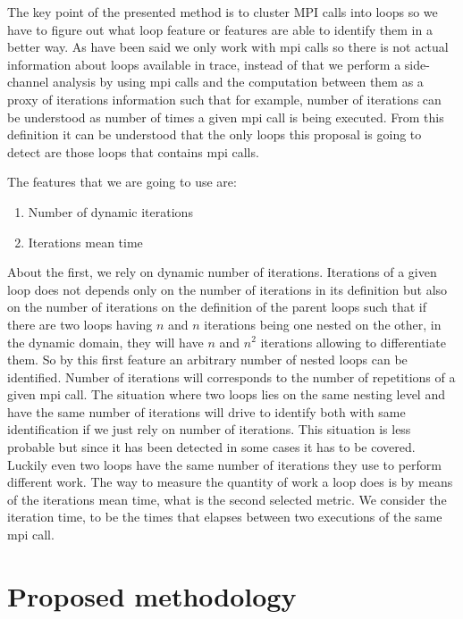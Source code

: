 The key point of the presented method is to cluster MPI calls into loops so we
have to figure out what loop
feature or features are able to identify them in a better way. As have been said
we only work with mpi calls so there is not actual information about loops
available in trace, instead of that we perform a side-channel analysis by using
mpi calls and the computation between them as a proxy of iterations information such
that for example, number of iterations can be understood as number of times a
given mpi call is being executed. From this definition it can be understood that
the only loops this proposal is going to detect are those loops that contains
mpi calls.

The features that we are going to use are:
\begin{enumerate}[label=\roman*)] 
  \item Number of dynamic iterations
  \item Iterations mean time
\end{enumerate}
About the first,  we rely on dynamic number of iterations. 
Iterations of a given loop does not depends only on the number of iterations in
its definition but also on the number of iterations on the definition of the
parent loops such that if there are two loops having $n$ and $n$ iterations
being one nested on the other, in the dynamic domain, they will have $n$ and 
$n^2$ iterations allowing to differentiate them. So by this first feature an
arbitrary number of nested loops can be identified.
Number of iterations will corresponds to the number of repetitions of a given 
mpi call.
The situation where two loops lies on the same nesting level and have the same 
number of iterations will drive to identify both with same identification if we just rely on number of iterations. This situation is less 
probable but since it has been detected in some cases it has to be 
covered. Luckily even two loops have the same number of iterations they use to 
perform different work. The way to measure the quantity of work a loop 
does is by means of the iterations mean time, what is the second 
selected metric. We consider the iteration time, to be the times that elapses 
between two executions of the same mpi call.

\section{Proposed methodology}

